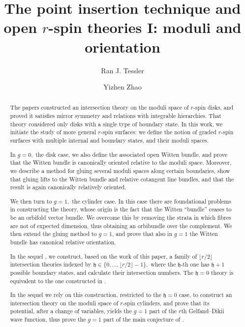 \documentclass[11pt,a4paper]{article}
\title{The point insertion technique and open $r$-spin theories I: moduli and orientation}
\date{}
\author{Ran J. Tessler \and Yizhen Zhao}
\theoremstyle{definition}
\theoremstyle{remark}
\numberwithin{equation}{section}
\def\h{{\mathfrak h}}
\begin{document}
\maketitle

\begin{abstract}
The papers \cite{BCT1,BCT2,BCT3,GKT} constructed an intersection theory on the moduli space of $r$-spin disks, and proved it satisfies mirror symmetry and relations with integrable hierarchies. That theory considered only disks with a single type of boundary state.
In this work, we initiate the study of more general $r$-spin surfaces:
we define the notion of graded $r$-spin surfaces with multiple internal and boundary states, and their moduli spaces. 

In $g=0,$ the disk case, we also define the associated open Witten bundle, and prove that the Witten bundle is canonically oriented relative to the moduli space.
Moreover, we describe a method for gluing several moduli spaces along certain boundaries, show that gluing lifts to the Witten bundle and relative cotangent line bundles, and that the result is again canonically relatively oriented.

{We then turn to $g=1,$ the cylinder case. In this case there are foundational problems in constructing the theory, whose origin is the fact that the Witten ``bundle'' ceases to be an orbifold vector bundle. We overcome this by removing the strata in which fibres are not of expected dimension, thus obtaining an orbibundle over the complement. We then extend the gluing method to $g=1$, and prove that also in $g=1$ the Witten bundle has canonical relative orientation.}

In the sequel \cite{TZ2}, we construct, based on the work of this paper, a family of $\lfloor r/2\rfloor$ intersection theories indexed by $\h\in\{0,\ldots,\lfloor r/2\rfloor-1\},$ where the $\h$-th one has $\h+1$ possible boundary states, and calculate their intersection numbers. The $\h=0$ theory is equivalent to the one constructed in \cite{BCT1,BCT2}.

{In the sequel \cite{TZ3} we rely on this construction, restricted to the $\h=0$ case, to construct an intersection theory on the moduli space of $r$-spin cylinders, and prove that its potential, after a change of variables, yields the $g=1$ part of the $r$th Gelfand--Dikii wave function, thus prove the $g=1$ part of the main conjecture of \cite{BCT3}.}

\end{abstract}
\end{document}
